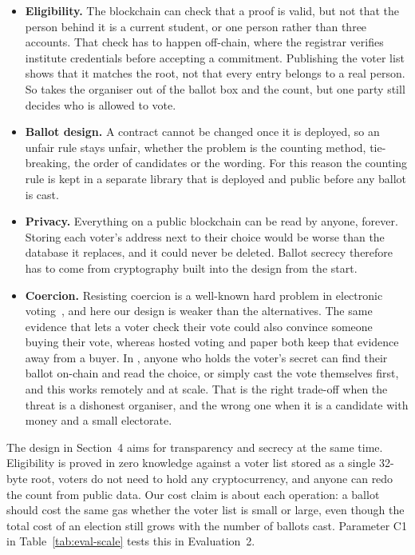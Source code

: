 \begin{itemize}[leftmargin=1.2em,itemsep=2pt,topsep=2pt]
  \item \textbf{Eligibility.} The blockchain can check that a proof is valid,
        but not that the person behind it is a current student, or one person
        rather than three accounts. That check has to happen off-chain, where
        the registrar verifies institute credentials before accepting a
        commitment. Publishing the voter list shows that it matches the root,
        not that every entry belongs to a real person. So \projectname{} takes
        the organiser out of the ballot box and the count, but one party still
        decides who is allowed to vote.

  \item \textbf{Ballot design.} A contract cannot be changed once it is
        deployed, so an unfair rule stays unfair, whether the problem is the
        counting method, tie-breaking, the order of candidates or the wording.
        For this reason the counting rule is kept in a separate library that is
        deployed and public before any ballot is cast.

  \item \textbf{Privacy.} Everything on a public blockchain can be read by
        anyone, forever. Storing each voter's address next to their choice
        would be worse than the database it replaces, and it could never be
        deleted. Ballot secrecy therefore has to come from cryptography built
        into the design from the start.

  \item \textbf{Coercion.} Resisting coercion is a well-known hard problem in
        electronic voting~\cite{jcj}, and here our design is weaker than the
        alternatives. The same evidence that lets a voter check their vote
        could also convince someone buying their vote, whereas hosted voting
        and paper both keep that evidence away from a buyer. In
        \projectname{}, anyone who holds the voter's secret can find their
        ballot on-chain and read the choice, or simply cast the vote
        themselves first, and this works remotely and at scale. That is the
        right trade-off when the threat is a dishonest organiser, and the wrong
        one when it is a candidate with money and a small electorate.
\end{itemize}

The design in Section~4 aims for transparency and secrecy at the same time.
Eligibility is proved in zero knowledge against a voter list stored as a single
32-byte root, voters do not need to hold any cryptocurrency, and anyone can
redo the count from public data. Our cost claim is about each operation: a
ballot should cost the same gas whether the voter list is small or large, even
though the total cost of an election still grows with the number of ballots
cast. Parameter C1 in Table~\ref{tab:eval-scale} tests this in Evaluation~2.
